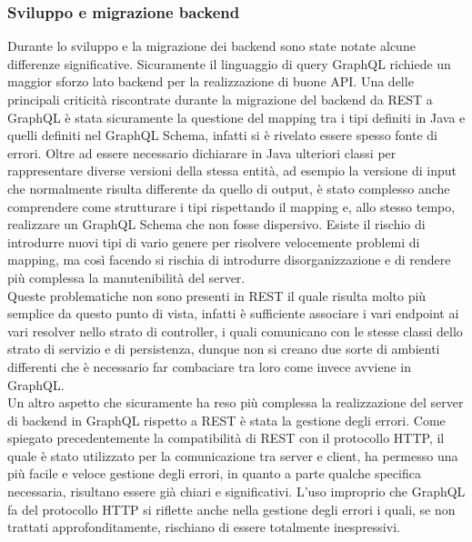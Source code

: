 \subsubsection*{Sviluppo e migrazione backend}
Durante lo sviluppo e la migrazione dei backend sono state notate alcune differenze significative. Sicuramente il linguaggio di query GraphQL richiede un maggior sforzo lato backend per la realizzazione di buone API. Una delle principali criticità riscontrate durante la migrazione del backend da REST a GraphQL è stata sicuramente la questione del mapping tra i tipi definiti in Java e quelli definiti nel GraphQL Schema, infatti si è rivelato essere spesso fonte di errori. Oltre ad essere necessario dichiarare in Java ulteriori classi per rappresentare diverse versioni della stessa entità, ad esempio la versione di input che normalmente risulta differente da quello di output, è stato complesso anche comprendere come strutturare i tipi rispettando il mapping e, allo stesso tempo, realizzare un GraphQL Schema che non fosse dispersivo. Esiste il rischio di introdurre nuovi tipi di vario genere per risolvere velocemente problemi di mapping, ma così facendo si rischia di introdurre disorganizzazione e di rendere più complessa la manutenibilità del server.\\
Queste problematiche non sono presenti in REST il quale risulta molto più semplice da questo punto di vista, infatti è sufficiente associare i vari endpoint ai vari resolver nello strato di controller, i quali comunicano con le stesse classi dello strato di servizio e di persistenza, dunque non si creano due sorte di ambienti differenti che è necessario far combaciare tra loro come invece avviene in GraphQL.\\
Un altro aspetto che sicuramente ha reso più complessa la realizzazione del server di backend in GraphQL rispetto a REST è stata la gestione degli errori. Come spiegato precedentemente la compatibilità di REST con il protocollo HTTP, il quale è stato utilizzato per la comunicazione tra server e client, ha permesso una più facile e veloce gestione degli errori, in quanto a parte qualche specifica necessaria, risultano essere già chiari e significativi. L'uso improprio che GraphQL fa del protocollo HTTP si riflette anche nella gestione degli errori i quali, se non trattati approfonditamente, rischiano di essere totalmente inespressivi.
